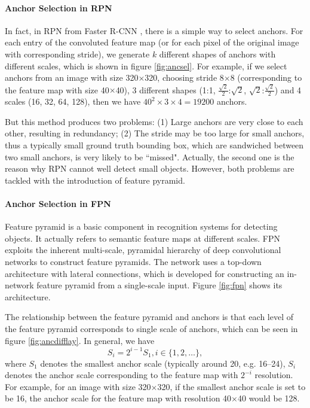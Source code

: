 \paragraph{Anchor Selection in RPN}
In fact, in RPN from Faster R-CNN \cite{fasterrcnn}, there is a simple way to select anchors. For each entry of the convoluted feature map (or for each pixel of the original image with corresponding stride), we generate $k$ different shapes of anchors with different scales, which is shown in figure \ref{fig:ancsel}. For example, if we select anchors from an image with size 320$\times$320, choosing stride 8$\times$8 (corresponding to the feature map with size 40$\times$40), 3 different shapes (1:1, $\frac{\sqrt{2}}{2}$:$\sqrt{2}$, $\sqrt{2}$:$\frac{\sqrt{2}}{2}$) and 4 scales (16, 32, 64, 128), then we have $40^2\times3\times4=19200$ anchors.



But this method produces two problems: (1) Large anchors are very close to each other, resulting in redundancy; (2) The stride may be too large for small anchors, thus a typically small ground truth bounding box, which are sandwiched between two small anchors, is very likely to be ``missed". Actually, the second one is the reason why RPN cannot well detect small objects. However, both problems are tackled with the introduction of feature pyramid.

\paragraph{Anchor Selection in FPN}
Feature pyramid is a basic component in recognition systems for detecting objects. It actually refers to semantic feature maps at different scales. FPN exploits the inherent multi-scale, pyramidal hierarchy of deep convolutional networks to construct feature pyramids. The network uses a top-down architecture with lateral connections, which is developed for constructing an in-network feature pyramid from a single-scale input. Figure \ref{fig:fpn} shows its architecture.



The relationship between the feature pyramid and anchors is that each level of the feature pyramid corresponds to single scale of anchors, which can be seen in figure \ref{fig:ancdifflay}. In general, we have
\begin{equation}
	S_i = 2^{i-1}S_1, i \in \{1,2,\ldots\},
\end{equation}
where $S_1$ denotes the smallest anchor scale (typically around 20, e.g. 16--24), $S_i$ denotes the anchor scale corresponding to the feature map with $2^{-i}$ resolution. For example, for an image with size 320$\times$320, if the smallest anchor scale is set to be 16, the anchor scale for the feature map with resolution 40$\times$40 would be 128.

